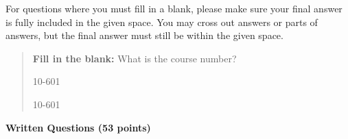 \documentclass[11pt,addpoints,answers]{exam}
\begin{document}
For questions where you must fill in a blank, please make sure your final answer is fully included in the given space. You may cross out answers or parts of answers, but the final answer must still be within the given space.

\begin{quote}
\textbf{Fill in the blank:} What is the course number?

\begin{tcolorbox}[fit,height=1cm, width=4cm, blank, borderline={1pt}{-2pt},nobeforeafter]
    \begin{center}\huge10-601\end{center}
    \end{tcolorbox}\hspace{2cm}
    \begin{tcolorbox}[fit,height=1cm, width=4cm, blank, borderline={1pt}{-2pt},nobeforeafter]
    \begin{center}\huge10-601\end{center}
    \end{tcolorbox}
\end{quote}

\clearpage\clearpage

{\LARGE \bf Written Questions (53 points)} 



\end{document}
